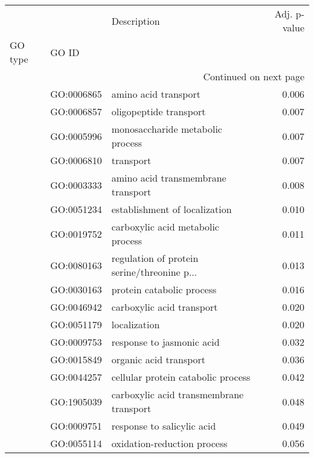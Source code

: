 \begin{longtable}{lllr}
\toprule
   &            &                                  Description &  Adj. p-value \\
GO type & GO ID &                                              &               \\
\midrule
\endhead
\midrule
\multicolumn{4}{r}{{Continued on next page}} \\
\midrule
\endfoot

\bottomrule
\endlastfoot
\multirow{33}{*}{BP} & GO:0006865 &                         amino acid transport &         0.006 \\
   & GO:0006857 &                       oligopeptide transport &         0.007 \\
   & GO:0005996 &             monosaccharide metabolic process &         0.007 \\
   & GO:0006810 &                                    transport &         0.007 \\
   & GO:0003333 &           amino acid transmembrane transport &         0.008 \\
   & GO:0051234 &                establishment of localization &         0.010 \\
   & GO:0019752 &            carboxylic acid metabolic process &         0.011 \\
   & GO:0080163 &  regulation of protein serine/threonine p... &         0.013 \\
   & GO:0030163 &                    protein catabolic process &         0.016 \\
   & GO:0046942 &                    carboxylic acid transport &         0.020 \\
   & GO:0051179 &                                 localization &         0.020 \\
   & GO:0009753 &                    response to jasmonic acid &         0.032 \\
   & GO:0015849 &                       organic acid transport &         0.036 \\
   & GO:0044257 &           cellular protein catabolic process &         0.042 \\
   & GO:1905039 &      carboxylic acid transmembrane transport &         0.048 \\
   & GO:0009751 &                   response to salicylic acid &         0.049 \\
   & GO:0055114 &                  oxidation-reduction process &         0.056 \\

\end{longtable}
